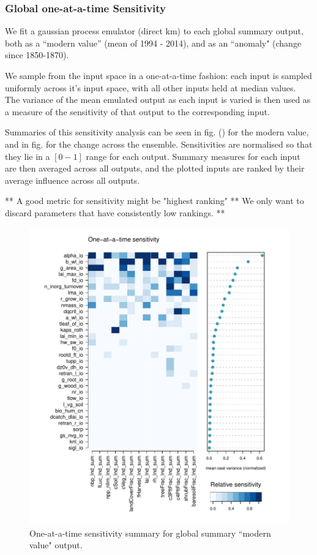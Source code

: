 \documentclass[gmd, manuscript]{copernicus}
\begin{document}
\subsubsection{Global one-at-a-time Sensitivity}

We fit a gaussian process emulator (direct km) to each global summary output, both as a ``modern value'' (mean of 1994 - 2014), and as an ``anomaly" (change since 1850-1870).

We sample from the input space in a one-at-a-time fashion: each input is sampled uniformly across it's input space, with all other inputs held at median values. The variance of the mean emulated output as each input is varied is then used as a measure of the sensitivity of that output to the corresponding input.

Summaries of this sensitivity analysis can be seen in fig. () for the modern value, and in fig. for the change across the ensemble. Sensitivities are normalised so that they lie in a $[0 -1]$ range for each output. Summary measures for each input are then averaged across all outputs, and the plotted inputs are ranked by their average influence across all outputs.

** A good metric for sensitivity might be "highest ranking" ** We only want to discard parameters that have consistently low rankings. **





\begin{figure}[t]
\includegraphics[width=12cm]{./graphics/oat_var_sensmat_level1a_Y}
\caption{One-at-a-time sensitivity summary for global summary ``modern value" output.}
\label{fig:oat_var_sensmat_level1a_Y}
\end{figure}
\end{document}
